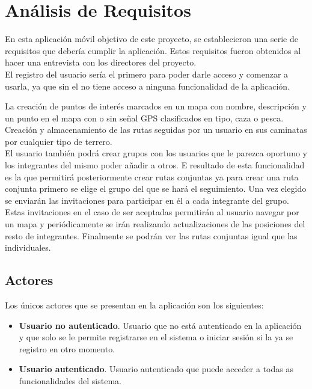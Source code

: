 
\section{Análisis de Requisitos}


En esta aplicación móvil objetivo de este proyecto, se establecieron una serie de requisitos que debería cumplir la aplicación. Estos requisitos fueron obtenidos al  hacer una entrevista con los directores del proyecto.\\

El registro del usuario sería el primero para poder darle acceso y comenzar a usarla, ya que sin el no tiene acceso a ninguna funcionalidad de la aplicación.

La creación de puntos de interés marcados en un mapa con nombre, descripción y un punto en el mapa con o sin señal GPS clasificados en tipo, caza o pesca. \\

Creación y almacenamiento de las rutas seguidas por un usuario en sus caminatas por cualquier tipo de terrero.\\

El usuario también podrá crear grupos con los usuarios que le parezca oportuno y los integrantes del mismo poder añadir a otros. E resultado de esta funcionalidad es la que permitirá posteriormente crear rutas conjuntas ya para crear una ruta conjunta primero se elige el grupo del que se hará el seguimiento. Una vez elegido se enviarán las invitaciones para participar en él a cada integrante del grupo. Estas invitaciones en el caso de ser aceptadas permitirán al usuario navegar por un mapa y periódicamente se irán realizando actualizaciones de las posiciones del resto de integrantes. Finalmente se podrán ver las rutas conjuntas igual que las individuales.
\subsection{Actores}

Los únicos actores que se presentan en la  aplicación son los siguientes:
\begin{itemize}
\item \textbf{Usuario no  autenticado}. Usuario que no está autenticado en la aplicación y que solo
se le permite registrarse en el  sistema o iniciar sesión si la ya se registro en otro momento.
\item \textbf{Usuario  autenticado}. Usuario autenticado que puede acceder a todas as funcionalidades
del sistema.
\end{itemize}
